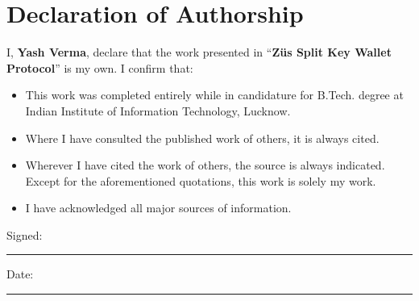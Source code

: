 \thispagestyle{empty}
\setcounter{page}{3}
\chapter*{Declaration of Authorship}
\vspace{1cm}
\noindent I, \textbf{Yash Verma}, declare that the work presented in ``\textbf{Züs Split Key Wallet Protocol}'' is my own. I confirm that:
\medskip
\begin{itemize}
\item This work was completed entirely while in candidature for B.Tech. degree at Indian Institute of Information Technology, Lucknow.
\medskip
\item Where I have consulted the published work of others, it is always cited.
\medskip
\item Wherever I have cited the work of others, the source is always indicated. Except for the aforementioned quotations, this work is solely my work.
\medskip
\item I have acknowledged all major sources of information.
\end{itemize}
\vspace{2cm}
\noindent Signed:\\
\rule[0.5em]{33em}{0.5pt}
\noindent Date:\\
\rule[0.5em]{33em}{0.5pt}
\cleardoublepage
